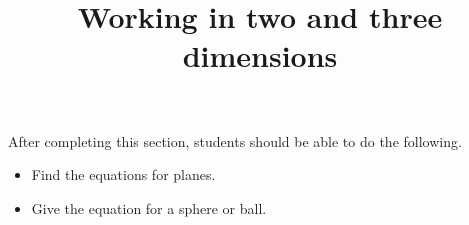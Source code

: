 \documentclass{ximera}
\title{Working in two and three dimensions}
\begin{document}
\begin{abstract}
\end{abstract}

\maketitle

\begin{sectionOutcomes}

After completing this section, students should be able to do the following.

\begin{itemize}
\item Find the equations for planes.
\item Give the equation for a sphere or ball.
\end{itemize}

\end{sectionOutcomes}
\end{document}
